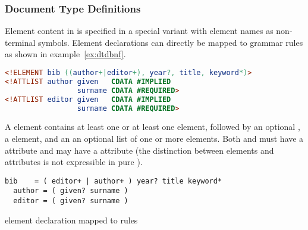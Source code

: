 \subsubsection{Document Type Definitions}
\label{sec:dtd}

Element content in  is specified in a special  variant with
 element names as non-terminal symbols. Element declarations can
directly be mapped to  grammar rules as shown in
example~\ref{ex:dtdbnf}.

\begin{example}[h]
\begin{lstlisting}[language=DTD]
<!ELEMENT bib ((author+|editor+), year?, title, keyword*)>
<!ATTLIST author given   CDATA #IMPLIED 
                 surname CDATA #REQUIRED>
<!ATTLIST editor given   CDATA #IMPLIED 
                 surname CDATA #REQUIRED>
\end{lstlisting}

A  element contains at least one  or at least one
 element, followed by an optional , a 
element, and an an optional list of one or more  elements.  Both
 and  must have a  attribute and may have
a  attribute (the distinction between elements and attributes is not
expressible in pure ).

\begin{lstlisting}[language=BNF]
  bib    = ( editor+ | author+ ) year? title keyword*
  author = ( given? surname )
  editor = ( given? surname )
\end{lstlisting}

\caption{ element declaration mapped to  rules}
\label{ex:dtdbnf}
\end{example}

